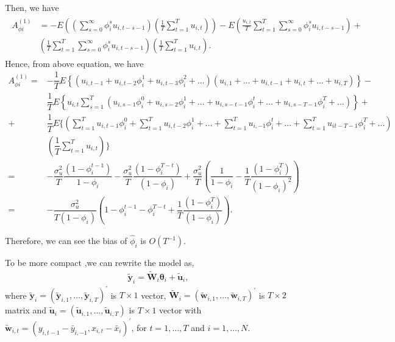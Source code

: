 \documentclass[12pt,a4paper,hyperref]{article}
\begin{document}
Then, we have
\begin{align}
\begin{split}
A^{(1)}_{\phi i}&=-E\left( \left(\sum^{\infty}_{s=0}\phi^{s}_{i}u_{i,t-s-1} \right) \left(\frac{1}{T}\sum^{T}_{t=1}u_{i,t} \right)  \right)-E\left(\frac{u_{i,t}}{T}\sum^{T}_{t=1}\sum^{\infty}_{s=0}\phi^{s}_{i}u_{i,t-s-1} \right)+ \\
&\left(\frac{1}{T}\sum^{T}_{t=1}\sum^{\infty}_{s=0}\phi^{s}_{i}u_{i,t-s-1} \right)\left( \frac{1}{T}\sum^{T}_{t=1}u_{i,t} \right). \label{12}
\end{split}
\end{align}
 Hence, from above equation, we have
 \begin{equation}
\begin{split}
A^{(1)}_{\phi i}=&-\dfrac{1}{T} E\left\{  \left( u_{i,t-1}+u_{i,t-2}\phi_{i}^{1}+u_{i,t-3}\phi_{i}^{2}+\ldots\right)\left(u_{i,1}+\ldots+u_{i,t-1}+u_{i,t}+\ldots+u_{i,T}\right) \right\} -\\
 &\dfrac{1}{T} E \left\{  u_{i,t}\sum^{T}_{s=1}\left( u_{i,s-1}\phi_{i}^{0}+u_{i,s-2}\phi_{i}^{1}+\ldots+u_{i,s-t-1}\phi_{i}^{t}+\ldots+u_{i,s-T-1}\phi_{i}^{T}+\ldots \right)  \right\}  + \\
 +& \dfrac{1}{T} E\{ \left( \sum^{T}_{t=1}u_{i,t-1}\phi_{i}^{0}+\sum^{T}_{t=1}u_{i,t-2}\phi_{i}^{1}+\ldots+\sum^{T}_{t=1}u_{i,-1}\phi_{i}^{t}+\ldots
+\sum^{T}_{t=1}u_{it-T-1}\phi_{i}^{T}+\ldots \right)\\
 &\left(\dfrac{1}{T}\sum^{T}_{t=1}u_{i,t}\right) \} \\
 =&-\dfrac{\sigma_{u}^{2}}{T}\dfrac{(1-\phi_{i}^{t-1})}{1-\phi_{i}}-\dfrac{\sigma^{2}_{u}}{T}\dfrac{(1-\phi_{i}^{T-t})}{(1-\phi_{i})}+\dfrac{\sigma^{2}_{u}}{T} \left( \dfrac{1}{1-\phi_{i}}-\dfrac{1}{T}\dfrac{(1-\phi_{i}^{T})}{(1-\phi_{i})^{2}}\right) \\
 =&-\dfrac{\sigma_{u}^{2}}{T(1-\phi_{i})}\left( 1-\phi_{i}^{t-1}-\phi_{i}^{T-t}+\dfrac{1}{T}\dfrac{(1-\phi_{i}^{T})}{(1-\phi_{i})}  \right).
 \end{split}
\end{equation}


Therefore, we can see the bias of $\hat{\phi}_{i}$ is $O\left(T^{-1}\right)$.

To be more compact ,we can rewrite the model as,
\begin{align}
\tilde{\boldsymbol{y}}_{i}=\tilde{\boldsymbol{W}}_{i}\boldsymbol{\theta}_{i}+\tilde{\boldsymbol{u}}_{i},
\end{align}
where $\tilde{\boldsymbol{y}}_{i}=\left(\tilde{\boldsymbol{y}}_{i,1},\ldots, \tilde{\boldsymbol{y}}_{i,T}  \right)^{'}$ is $T \times 1$ vector,  $\tilde{\boldsymbol{W}}_{i}=\left( \tilde{\boldsymbol{w}}_{i,1},\ldots, \tilde{\boldsymbol{w}}_{i,T} \right)^{'}$ is $T \times 2$ matrix and $\tilde{\boldsymbol{u}}_{i}=\left(\tilde{\boldsymbol{u}}_{i,1}, \ldots, \tilde{\boldsymbol{u}}_{i,T} \right)$ is $T \times 1$ vector with $\tilde{\boldsymbol{w}}_{i,t}=\left(y_{i,t-1}-\bar{y}_{i,-1}, x_{i,t}-\bar{x}_{i}  \right)^{'}$, for $t=1,\ldots, T$ and $i=1,\ldots, N.$
\end{document}
